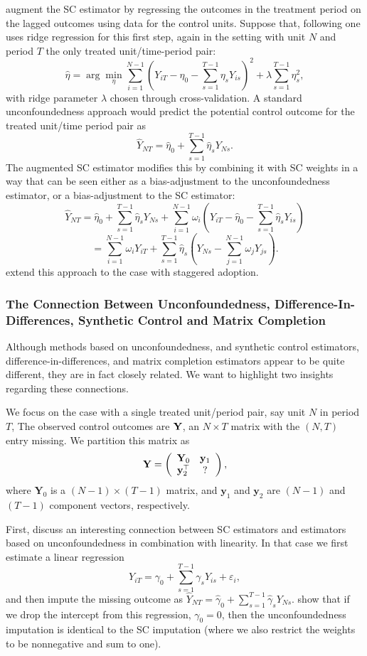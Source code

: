\documentclass[letterpaper,12pt,leqno]{article}
\newcommand{\tty}{{\mathbf{Y}_0}}
\newcommand{\bye}{\mathbf{y}_1}
\newcommand{\byt}{\mathbf{y}_2}
\newcommand{\bytt}{\mathbf{y}_2^\top}
\newcommand{\by}{{\bf Y}}
\begin{document}
\citep{ben2021augmented} augment the SC estimator by regressing the outcomes in the treatment period on the lagged outcomes using data for the control units. Suppose that, following \citep{ben2021augmented} one uses ridge regression for this first step, again in the setting with unit $N$ and period $T$ the only treated unit/time-period pair:
\[ \hat\eta=\arg\min_\eta \sum_{i=1}^{N-1} \left( Y_{iT}-\eta_0-\sum_{s=1}^{T-1} \eta_s Y_{is}\right)^2+\lambda \sum_{s=1}^{T-1} \eta_s^2,\]
with ridge parameter $\lambda$ chosen through cross-validation.
A standard unconfoundedness approach would predict the potential control outcome for the treated unit/time period pair as
\[  \hat Y_{NT}=\hat\eta_0+\sum_{s=1}^{T-1}
\hat\eta_s Y_{Ns}
.\]
The augmented SC estimator modifies this by combining it with SC weights in a way that can be seen either as a bias-adjustment to the unconfoundedness estimator, or a bias-adjustment to the SC estimator:
\[ \hat Y_{NT}=
\hat\eta_0+\sum_{s=1}^{T-1}
\hat\eta_s Y_{Ns}+
\sum_{i=1}^{N-1} \omega_i\left( Y_{iT}-\hat\eta_0-\sum_{s=1}^{T-1}
\hat\eta_s  Y_{is}\right)
\]
\[ =\sum_{i=1}^{N-1} \omega_i Y_{iT}+\sum_{s=1}^{T-1}
\hat\eta_s \left(Y_{Ns}-\sum_{j=1}^{N-1} \omega_j Y_{js}
\right).\]
\citep*{ben2022synthetic} extend this approach to the case with staggered adoption.

\subsubsection{The Connection Between Unconfoundedness, Difference-In-Differences, Synthetic Control and Matrix Completion}

Although methods based on unconfoundedness, and synthetic control estimators, difference-in-differences, and matrix completion estimators appear to be quite different, they are in fact closely related.  We want to highlight two insights regarding these connections.

We focus on the case with a single treated unit/period pair, say unit $N$ in period $T$,	The observed control outcomes are $\by$, an $N\times T$ matrix with the $(N,T)$ entry missing. We  partition this matrix as
\[ \by=\left(
\begin{array}{cc}
	\tty & \bye\\
	\bytt & ?
	\end{array}\right),\]
	where $\tty$ is a $(N-1)\times (T-1)$ matrix, and
	$\bye$ and $\byt$ are  $(N-1)$
and $(T-1)$ component vectors, respectively.
	

First, \citep*{shen2022tale} discuss an interesting connection between SC estimators and estimators based on unconfoundedness in combination with linearity. In that case we first estimate a linear regression
\[ Y_{iT}=\gamma_0+\sum_{s=1}^{T-1} \gamma_s Y_{is}+\varepsilon_{i},\]
and then impute the missing outcome as $\hat{Y}_{NT}=\hat\gamma_0+
\sum_{s=1}^{T-1} \hat\gamma_s Y_{Ns}$. \citep*{shen2022tale} show that if we drop the intercept from this regression, $\gamma_0=0$,  then the unconfoundedness imputation is identical to the SC imputation (where we also restrict the weights to be nonnegative and sum to one).
\end{document}
